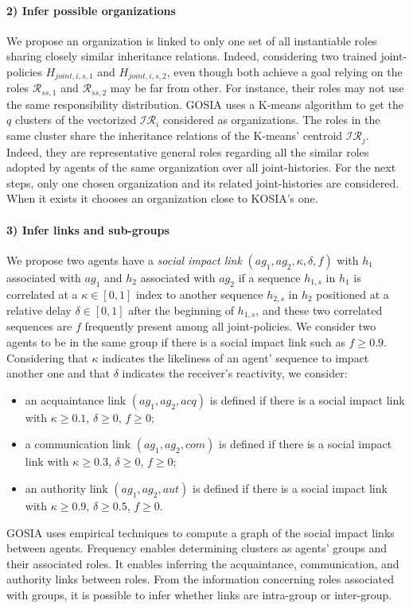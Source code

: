 \documentclass[runningheads]{llncs}
\newcounter{relation}
\begin{document}
\paragraph{2) Infer possible organizations}

We propose an organization is linked to only one set of all instantiable roles sharing closely similar inheritance relations. Indeed, considering two trained joint-policies $H_{joint,i,s,1}$ and $H_{joint,i,s,2}$, even though both achieve a goal relying on the roles $\mathcal{R}_{ss,1}$ and $\mathcal{R}_{ss,2}$ may be far from other. For instance, their roles may not use the same responsibility distribution.
GOSIA uses a K-means algorithm to get the $q$ clusters of the vectorized $\mathcal{IR}_{i}$ considered as organizations. The roles in the same cluster share the inheritance relations of the K-means' centroid $\mathcal{IR}_j$. Indeed, they are representative general roles regarding all the similar roles adopted by agents of the same organization over all joint-histories.
For the next steps, only one chosen organization and its related joint-histories are considered. When it exists it chooses an organization close to KOSIA's one.

\paragraph{3) Infer links and sub-groups}

We propose two agents have a \emph{social impact link} $(ag_1,ag_2, \kappa, \delta, f)$ with $h_1$ associated with $ag_1$ and $h_2$ associated with $ag_2$ if a sequence $h_{1,s}$ in $h_1$ is correlated at a $\kappa \in [0,1]$ index to another sequence $h_{2,s}$ in $h_2$ positioned at a relative delay $\delta \in [0,1]$ after the beginning of $h_{1,s}$, and these two correlated sequences are $f$ frequently present among all joint-policies.
We consider two agents to be in the same group if there is a social impact link such as $f \geq 0.9$. Considering that $\kappa$ indicates the likeliness of an agent' sequence to impact another one and that $\delta$ indicates the receiver's reactivity, we consider:
\begin{itemize}
    \item an acquaintance link $(ag_1,ag_2,acq)$ is defined if there is a social impact link with $\kappa \geq 0.1$, $\delta \geq 0$, $f \geq 0$;
    \item a communication link $(ag_1,ag_2,com)$ is defined if there is a social impact link with $\kappa \geq 0.3$, $\delta \geq 0$, $f \geq 0$;
    \item an authority link $(ag_1,ag_2,aut)$ is defined if there is a social impact link with $\kappa \geq 0.9$, $\delta \geq 0.5$, $f \geq 0$.
\end{itemize}
GOSIA uses empirical techniques to compute a graph of the social impact links between agents. Frequency enables determining clusters as agents' groups and their associated roles. It enables inferring the acquaintance, communication, and authority links between roles. From the information concerning roles associated with groups, it is possible to infer whether links are intra-group or inter-group.
\end{document}
